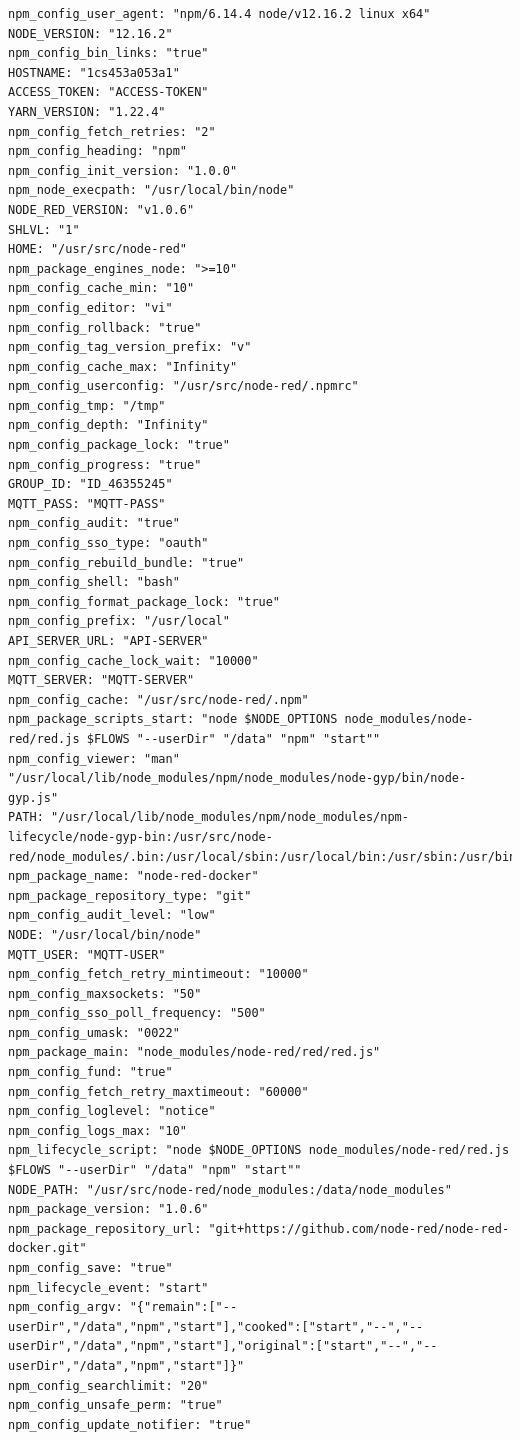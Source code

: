 \documentclass[a4paper,10pt]{memoir}
\begin{document}
\begin{lstlisting}
npm_config_user_agent: "npm/6.14.4 node/v12.16.2 linux x64"
NODE_VERSION: "12.16.2"
npm_config_bin_links: "true"
HOSTNAME: "1cs453a053a1"
ACCESS_TOKEN: "ACCESS-TOKEN"
YARN_VERSION: "1.22.4"
npm_config_fetch_retries: "2"
npm_config_heading: "npm"
npm_config_init_version: "1.0.0"
npm_node_execpath: "/usr/local/bin/node"
NODE_RED_VERSION: "v1.0.6"
SHLVL: "1"
HOME: "/usr/src/node-red"
npm_package_engines_node: ">=10"
npm_config_cache_min: "10"
npm_config_editor: "vi"
npm_config_rollback: "true"
npm_config_tag_version_prefix: "v"
npm_config_cache_max: "Infinity"
npm_config_userconfig: "/usr/src/node-red/.npmrc"
npm_config_tmp: "/tmp"
npm_config_depth: "Infinity"
npm_config_package_lock: "true"
npm_config_progress: "true"
GROUP_ID: "ID_46355245"
MQTT_PASS: "MQTT-PASS"
npm_config_audit: "true"
npm_config_sso_type: "oauth"
npm_config_rebuild_bundle: "true"
npm_config_shell: "bash"
npm_config_format_package_lock: "true"
npm_config_prefix: "/usr/local"
API_SERVER_URL: "API-SERVER"
npm_config_cache_lock_wait: "10000"
MQTT_SERVER: "MQTT-SERVER"
npm_config_cache: "/usr/src/node-red/.npm"
npm_package_scripts_start: "node $NODE_OPTIONS node_modules/node-red/red.js $FLOWS "--userDir" "/data" "npm" "start""
npm_config_viewer: "man" "/usr/local/lib/node_modules/npm/node_modules/node-gyp/bin/node-gyp.js"
PATH: "/usr/local/lib/node_modules/npm/node_modules/npm-lifecycle/node-gyp-bin:/usr/src/node-red/node_modules/.bin:/usr/local/sbin:/usr/local/bin:/usr/sbin:/usr/bin:/sbin:/bin"
npm_package_name: "node-red-docker"
npm_package_repository_type: "git"
npm_config_audit_level: "low"
NODE: "/usr/local/bin/node"
MQTT_USER: "MQTT-USER"
npm_config_fetch_retry_mintimeout: "10000"
npm_config_maxsockets: "50"
npm_config_sso_poll_frequency: "500"
npm_config_umask: "0022"
npm_package_main: "node_modules/node-red/red/red.js"
npm_config_fund: "true"
npm_config_fetch_retry_maxtimeout: "60000"
npm_config_loglevel: "notice"
npm_config_logs_max: "10"
npm_lifecycle_script: "node $NODE_OPTIONS node_modules/node-red/red.js $FLOWS "--userDir" "/data" "npm" "start""
NODE_PATH: "/usr/src/node-red/node_modules:/data/node_modules"
npm_package_version: "1.0.6"
npm_package_repository_url: "git+https://github.com/node-red/node-red-docker.git"
npm_config_save: "true"
npm_lifecycle_event: "start"
npm_config_argv: "{"remain":["--userDir","/data","npm","start"],"cooked":["start","--","--userDir","/data","npm","start"],"original":["start","--","--userDir","/data","npm","start"]}"
npm_config_searchlimit: "20"
npm_config_unsafe_perm: "true"
npm_config_update_notifier: "true"

\end{lstlisting}
\end{document}
